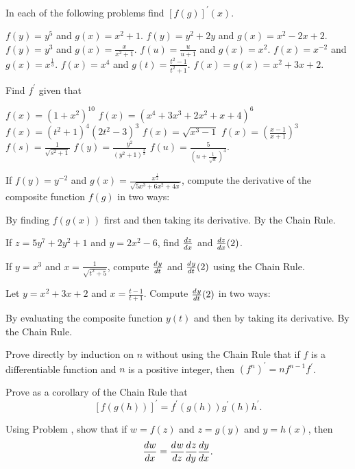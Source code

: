 \begin{exercises}

In each of the following problems find $[f(g)]^\prime (x)$.
\begin{exenum}
\sx
$f(y) = y^5$ and $g(x) = x^2 + 1$.
\sx
$f(y) = y^2 + 2y$ and $g(x) = x^2 - 2x + 2$.
\sx
$f(y) = y^3$ and $g(x) = \frac{x}{x^2+1}$.
\sx
$f(u) = \frac{u}{u+1}$ and $g(x) = x^2$.
\sx
$f(x) = x^{-2}$ and $g(x) = x^\frac13$.
\sx
$f(x) = x^4$ and $g(t) = \frac{t^2-1}{t^2+1}$.
\sx
$f(x) = g(x) = x^2 + 3x +2$.
\end{exenum}

Find $f^\prime$ given that
\begin{exenum}
\sx
$f(x) = (1 + x^2)^{10}$
\sx
$f(x) = (x^4 + 3x^3 + 2x^2 + x +4)^6$
\sx
$f(x) = (t^2 + 1)^4(2t^2 - 3)^3$
\sx
$f(x) = \sqrt{x^3 -1}$
\sx
$f(x) = \left( \frac{x-1}{x+1} \right)^3$
\sx
$f(s) = \frac1{\sqrt{s^2 + 1}}$
\sx
$f(y) = \frac{y^2}{(y^2 +1)^{\frac32}}$
\sx
$f(u) = \frac5{\left( u + \frac1{\sqrt u} \right)^4}$.
\end{exenum}

If $f(y) = y^{-2}$ and $g(x)= \frac{x^{\frac12}}
{\sqrt{5x^3 + 6x^2 + 4x}}$, compute the derivative of the composite
function $f(g)$ in two ways:
\begin{exenum}
\sx
By finding $f(g(x))$ first and then taking its derivative.
\sx
By the Chain Rule.
\end{exenum}

If $z = 5y^7 + 2y^2 + 1$ and $y = 2x^2 - 6$,
find $\frac{d z}{d x}$ and $\frac{d z}{d x} (2)$.

If $y = x^3$ and $x = \frac1{\sqrt{t^2+5}}$, compute
$\frac{d^{}{y}}{d{t}^{}}$ and $\frac{d^{}{y}}{d{t}^{}} (2)$ using the Chain Rule.

Let $y = x^2 + 3x + 2$ and $x = \frac{t-1}{t+1}$.
Compute $\frac{d^{}{y}}{d{t}^{}} (2)$ in two ways:
\begin{exenum}
\sx
By evaluating the composite function $y(t)$ and then
by taking its derivative.
\sx
By the Chain Rule.
\end{exenum}

Prove directly by induction on $n$ without using the Chain Rule
that if $f$ is a differentiable function and $n$ is a positive integer,
then $(f^n)^\prime = nf^{n-1}f^\prime$.

Prove as a corollary of the Chain Rule that
\[
[f(g(h))]^\prime = f^\prime(g(h))g^\prime(h)h^\prime
.
\]

Using Problem , show that if $w = f(z)$ and
$z = g(y)$ and $y = h(x)$, then
\[
\frac{d w}{d x} = \frac{d^{}{w}}{d{z}^{}} \frac{d^{}{z}}{d{y}^{}} \frac{d y}{d x}
.
\]


\end{exercises}
